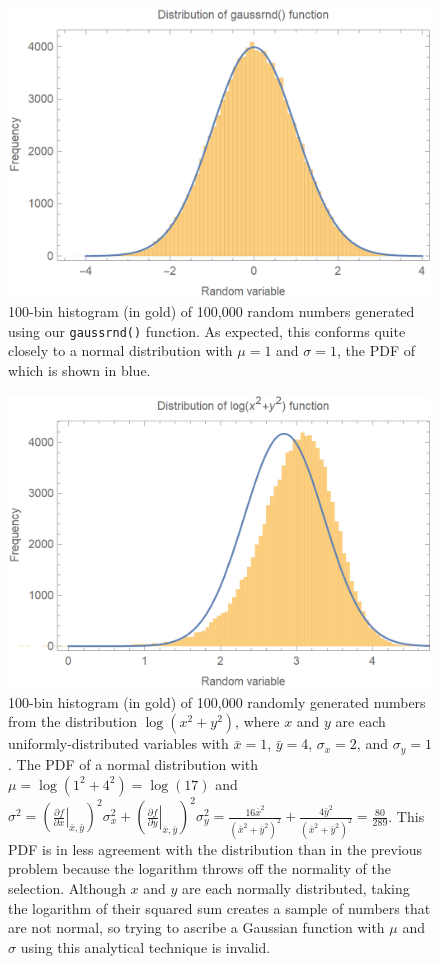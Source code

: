 \documentclass{article}
\begin{document}
\begin{figure}[H]
    \centering
    \includegraphics[width=4.4in]{homework7/normal_dist.png}
    \caption{100-bin histogram (in gold) of 100,000 random numbers generated using our \texttt{gaussrnd()} function. As expected, this conforms quite closely to a normal distribution with $\mu=1$ and $\sigma=1$, the PDF of which is shown in blue.}
    \label{fig:gaussrnd}
\end{figure}

\bigskip
{}
\medskip

\begin{figure}[H]
    \centering
    \includegraphics[width=4.4in]{homework7/log_dist.png}
    \caption{100-bin histogram (in gold) of 100,000 randomly generated numbers from the distribution $\log(x^2+y^2)$, where $x$ and $y$ are each uniformly-distributed variables with $\bar{x}=1$, $\bar{y}=4$, $\sigma_x=2$, and $\sigma_y=1$. The PDF of a normal distribution with $\mu=\log(1^2+4^2)=\log(17)$ and $\displaystyle \sigma^2=\left(\left.\frac{\partial f}{\partial x}\right|_{\bar{x},\bar{y}}\right)^2\sigma_x^2 + \left(\left.\frac{\partial f}{\partial y}\right|_{\bar{x},\bar{y}}\right)^2\sigma_y^2 = \frac{16\bar{x}^2}{(\bar{x}^2+\bar{y}^2)^2}+\frac{4\bar{y}^2}{(\bar{x}^2+\bar{y}^2)^2}=\frac{80}{289}$. This PDF is in less agreement with the distribution than in the previous problem because the logarithm throws off the normality of the selection. Although $x$ and $y$ are each normally distributed, taking the logarithm of their squared sum creates a sample of numbers that are not normal, so trying to ascribe a Gaussian function with $\mu$ and $\sigma$ using this analytical technique is invalid.}
    \label{fig:logx2y2}
\end{figure}
\end{document}
